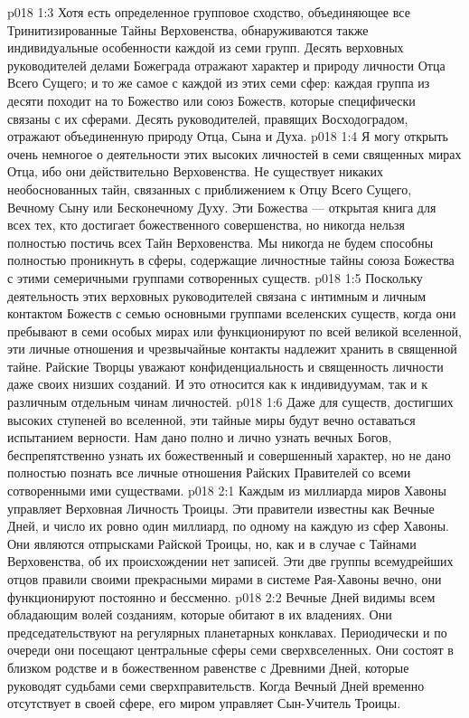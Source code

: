 \vs p018 1:3 Хотя есть определенное групповое сходство, объединяющее все Тринитизированные Тайны Верховенства, обнаруживаются также индивидуальные особенности каждой из семи групп. Десять верховных руководителей делами Божеграда отражают характер и природу личности Отца Всего Сущего; и то же самое с каждой из этих семи сфер: каждая группа из десяти походит на то Божество или союз Божеств, которые специфически связаны с их сферами. Десять руководителей, правящих Восходоградом, отражают объединенную природу Отца, Сына и Духа.
\vs p018 1:4 \pc Я могу открыть очень немногое о деятельности этих высоких личностей в семи священных мирах Отца, ибо они действительно  Верховенства. Не существует никаких необоснованных тайн, связанных с приближением к Отцу Всего Сущего, Вечному Сыну или Бесконечному Духу. Эти Божества --- открытая книга для всех тех, кто достигает божественного совершенства, но никогда нельзя полностью постичь всех Тайн Верховенства. Мы никогда не будем способны полностью проникнуть в сферы, содержащие личностные тайны союза Божества с этими семеричными группами сотворенных существ.
\vs p018 1:5 Поскольку деятельность этих верховных руководителей связана с интимным и личным контактом Божеств с семью основными группами вселенских существ, когда они пребывают в семи особых мирах или функционируют по всей великой вселенной, эти личные отношения и чрезвычайные контакты надлежит хранить в священной тайне. Райские Творцы уважают конфиденциальность и священность личности даже своих низших созданий. И это относится как к индивидуумам, так и к различным отдельным чинам личностей.
\vs p018 1:6 Даже для существ, достигших высоких ступеней во вселенной, эти тайные миры будут вечно оставаться испытанием верности. Нам дано полно и лично узнать вечных Богов, беспрепятственно узнать их божественный и совершенный характер, но не дано полностью познать все личные отношения Райских Правителей со всеми сотворенными ими существами.
\vs p018 2:1 Каждым из миллиарда миров Хавоны управляет Верховная Личность Троицы. Эти правители известны как Вечные Дней, и число их ровно один миллиард, по одному на каждую из сфер Хавоны. Они являются отпрысками Райской Троицы, но, как и в случае с Тайнами Верховенства, об их происхождении нет записей. Эти две группы всемудрейших отцов правили своими прекрасными мирами в системе Рая\hyp{}Хавоны вечно, они функционируют постоянно и бессменно.
\vs p018 2:2 Вечные Дней видимы всем обладающим волей созданиям, которые обитают в их владениях. Они председательствуют на регулярных планетарных конклавах. Периодически и по очереди они посещают центральные сферы семи сверхвселенных. Они состоят в близком родстве и в божественном равенстве с Древними Дней, которые руководят судьбами семи сверхправительств. Когда Вечный Дней временно отсутствует в своей сфере, его миром управляет Сын\hyp{}Учитель Троицы.

